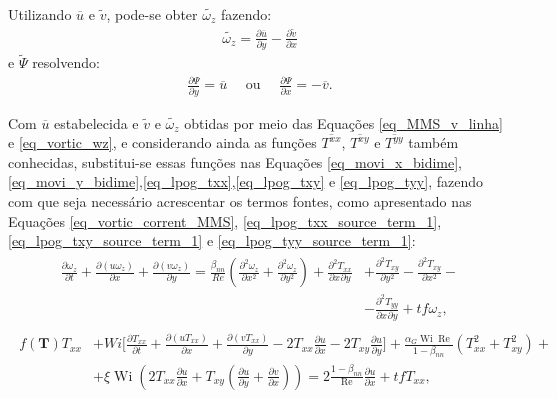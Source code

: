 Utilizando $\overline{u}$ e $\widetilde{v}$, pode-se obter $\widetilde{\omega_z}$ fazendo:
\begin{align}\label{eq_vortic_wz}
    \widetilde{\omega_z} = \frac{\partial \overline{u}}{\partial y}-\frac{\partial \widetilde{v}}{\partial x}
\end{align}
e $\widetilde{\Psi}$ resolvendo:
\begin{align}\label{eq_funcaocorrente_psi}
    \frac{\partial \Psi}{\partial y} = \overline{u}\quad\text{ ou }\quad\frac{\partial \Psi}{\partial x} = -\overline{v}.
\end{align}

Com $\overline{u}$ estabelecida e $\widetilde{v}$ e $\widetilde{\omega_z}$ obtidas por meio das Equações \eqref{eq_MMS_v_linha} e \eqref{eq_vortic_wz}, e considerando ainda as funções $\overline{T^{xx}}$, $\overline{T^{xy}}$ e $\overline{T^{yy}}$ também conhecidas, substitui-se essas funções nas Equações \eqref{eq_movi_x_bidime},\eqref{eq_movi_y_bidime},\eqref{eq_lpog_txx},\eqref{eq_lpog_txy} e \eqref{eq_lpog_tyy}, fazendo com que seja necessário acrescentar os termos fontes, como apresentado nas Equações \eqref{eq_vortic_corrent_MMS}, \eqref{eq_lpog_txx_source_term_1}, \eqref{eq_lpog_txy_source_term_1} e \eqref{eq_lpog_tyy_source_term_1}:
\begin{gather}
    \begin{aligned}
        \frac{\partial \omega_{z}}{\partial t} + \frac{\partial (u\omega_{z})}{\partial x} + \frac{\partial (v\omega_{z})}{\partial y} = \frac{\beta_{nn}}{Re}\left(\frac{\partial^{2} \omega_{z}}{\partial x^{2}} + \frac{\partial^{2} \omega_{z}}{\partial y^{2}}\right) + \frac{\partial^{2}T_{xx}}{\partial x^{}\partial y^{}} & +  \frac{\partial^{2}T_{xy}}{\partial y^{2}} - \frac{\partial^{2}T_{xy}}{\partial x^{2}} - \\ & -  \frac{\partial^{2}T_{yy}}{\partial x^{}\partial y^{}} + tf\omega_{z},
    \end{aligned}
    \label{eq_vortic_corrent_MMS}
\end{gather}
\begin{gather}
    \begin{aligned}
        f(\mathbf{T})T_{xx} & + Wi\bigg[\frac{\partial T_{xx}}{\partial t} + \frac{\partial (uT_{xx})}{\partial x} + \frac{\partial (vT_{xx})}{\partial y} - 2T_{xx}\frac{\partial u}{\partial x} - 2T_{xy}\frac{\partial u}{\partial y}\bigg] + \frac{\alpha_{G}\operatorname{Wi}\operatorname{Re}}{1-\beta_{nn}}\left(T_{xx}^{2} + T_{xy}^{2}\right) + \\ & + \xi\operatorname{Wi}\left(2T_{xx}\frac{\partial u}{\partial x} + T_{xy}\left(\frac{\partial u}{\partial y} + \frac{\partial v}{\partial x}\right)\right) = 2\frac{1-\beta_{nn}}{\operatorname{Re}}\frac{\partial u}{\partial x} + tfT_{xx},
    \end{aligned}
    \label{eq_lpog_txx_source_term_1}
\end{gather}
